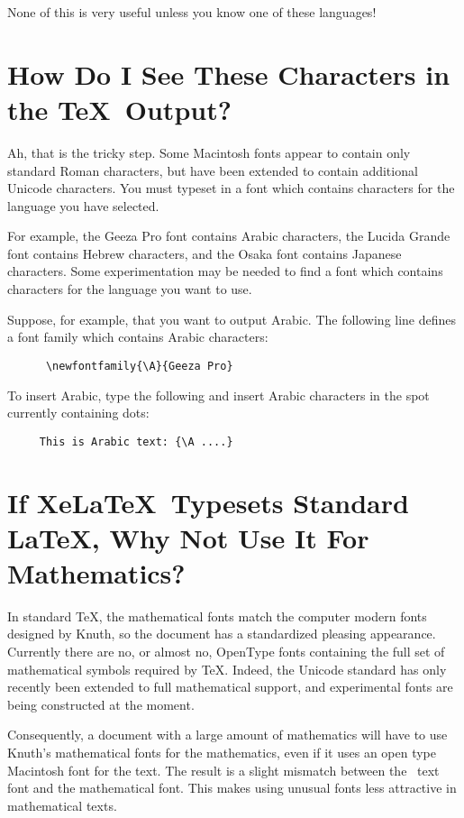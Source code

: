 \documentclass[11pt, oneside]{amsart}
\begin{document}
\begin{multicols}{2}
None of this is very useful unless you know one of these languages!

\section{How Do I See These Characters in the \TeX\ Output?}

Ah, that is the tricky step. Some Macintosh fonts appear to contain only standard Roman characters, but have been extended to contain additional Unicode characters.
You must typeset in a font which contains characters for the language you have selected.

For example, the Geeza Pro font contains Arabic characters, the Lucida Grande font contains Hebrew characters, and the Osaka font contains Japanese characters. Some experimentation may be needed to find a font which contains characters for the language you want to use. 

Suppose, for example, that you want to output Arabic. The following line defines a font family which contains Arabic characters:
\begin{verbatim}
      \newfontfamily{\A}{Geeza Pro}
\end{verbatim}

To insert Arabic, type the following and insert Arabic characters in the spot currently containing dots:
\begin{verbatim}
     This is Arabic text: {\A ....}
\end{verbatim}

\section{If Xe\LaTeX\ Typesets Standard \LaTeX, Why Not Use It For Mathematics?}

In standard \TeX, the mathematical fonts match the computer modern fonts designed by Knuth, so the document has a standardized pleasing appearance. Currently there are no, or almost no, OpenType fonts containing the full set of mathematical symbols required by \TeX. Indeed, the Unicode standard has only recently been extended to full mathematical support, and experimental fonts are being constructed at the moment.

Consequently, a document with a large amount of mathematics will have to use Knuth's mathematical fonts for the mathematics, even if it uses an open type Macintosh font for the text.  The result is  a slight mismatch between the \ text font and the  mathematical font. This makes using unusual fonts less attractive in mathematical texts.


\end{multicols}
\end{document}
